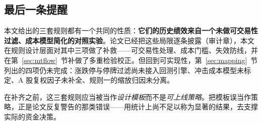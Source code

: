 \subsection{最后一条提醒}

本文给出的三套规则都有一个共同的性质：\textbf{它们的历史绩效来自一个未做可交易性过滤、成本模型简化的对照实验}。论文已经把这些局限逐条披露（审计章），本文在规则设计层面对其中三项做了补救——可交易性处理、成本门槛、失效防线，并在第~\ref{sec:mtflow}~节补做了多重检验校正。但回到可实现性，第~\ref{sec:mapping}~节列出的四项仍未完成：涨跌停与停牌过滤尚未接入回测引擎、冲击成本模型未标定、A 股复权因子未补全、规则一的缩放归因未分离。

在补齐之前，这三套规则应当被当作\emph{设计模板}而不是\emph{可上线策略}。把模板误当作策略，正是论文反复警告的那类错误——用统计上尚不足以称为显著的结果，去支撑实际的资金决策。
